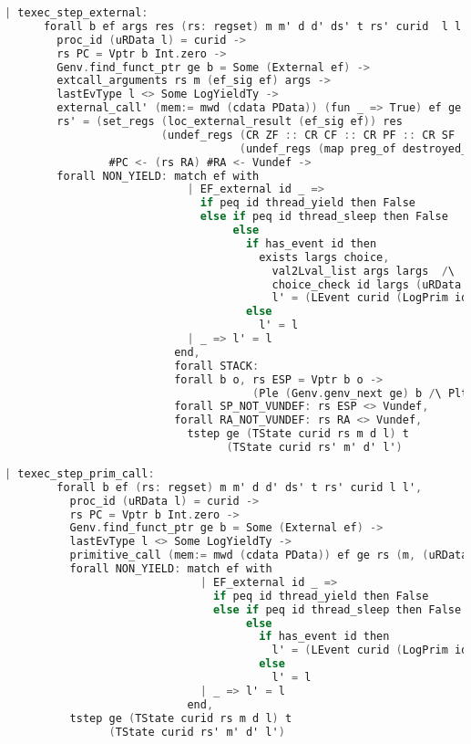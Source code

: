 \begin{lstlisting}[language=C]
  | texec_step_external:
      forall b ef args res (rs: regset) m m' d d' ds' t rs' curid  l l',
        proc_id (uRData l) = curid ->
        rs PC = Vptr b Int.zero ->
        Genv.find_funct_ptr ge b = Some (External ef) ->
        extcall_arguments rs m (ef_sig ef) args ->
        lastEvType l <> Some LogYieldTy ->
        external_call' (mem:= mwd (cdata PData)) (fun _ => True) ef ge args (m, (uRData l, d)) t res (m', (ds',d')) ->
        rs' = (set_regs (loc_external_result (ef_sig ef)) res 
                        (undef_regs (CR ZF :: CR CF :: CR PF :: CR SF :: CR OF :: nil)
                                    (undef_regs (map preg_of destroyed_at_call) rs))) 
                #PC <- (rs RA) #RA <- Vundef ->
        forall NON_YIELD: match ef with
                            | EF_external id _ => 
                              if peq id thread_yield then False
                              else if peq id thread_sleep then False
                                   else
                                     if has_event id then
                                       exists largs choice,
                                         val2Lval_list args largs  /\
                                         choice_check id largs (uRData l) d = choice /\ 
                                         l' = (LEvent curid (LogPrim id largs choice (snap_func d)) :: l) 
                                     else
                                       l' = l
                            | _ => l' = l
                          end,
                          forall STACK:
                          forall b o, rs ESP = Vptr b o ->
                                      (Ple (Genv.genv_next ge) b /\ Plt b (Mem.nextblock m)),
                          forall SP_NOT_VUNDEF: rs ESP <> Vundef,
                          forall RA_NOT_VUNDEF: rs RA <> Vundef,
                            tstep ge (TState curid rs m d l) t 
                                  (TState curid rs' m' d' l')
\end{lstlisting}

\begin{lstlisting}[language=C]
    | texec_step_prim_call:
        forall b ef (rs: regset) m m' d d' ds' t rs' curid l l',
          proc_id (uRData l) = curid ->
          rs PC = Vptr b Int.zero ->
          Genv.find_funct_ptr ge b = Some (External ef) ->
          lastEvType l <> Some LogYieldTy ->
          primitive_call (mem:= mwd (cdata PData)) ef ge rs (m, (uRData l, d)) t rs' (m', (ds', d')) ->
          forall NON_YIELD: match ef with
                              | EF_external id _ => 
                                if peq id thread_yield then False
                                else if peq id thread_sleep then False
                                     else
                                       if has_event id then
                                         l' = (LEvent curid (LogPrim id nil 0 (snap_func d)) :: l)
                                       else
                                         l' = l
                              | _ => l' = l
                            end,
          tstep ge (TState curid rs m d l) t 
                (TState curid rs' m' d' l')
\end{lstlisting}


